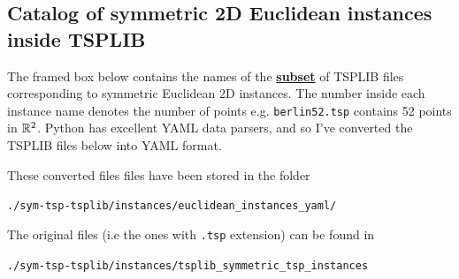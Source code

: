 \begin{appendices}
\section{Catalog of symmetric 2D Euclidean instances inside TSPLIB}
\label{sec:catalog}
The framed box below contains the names of the \textbf{\underline{subset}} of TSPLIB files corresponding to symmetric Euclidean 2D instances. 
The number inside each instance name denotes the number of points e.g. \verb|berlin52.tsp| contains 52 points in $\mathbb{R}^2$. 
Python has excellent YAML data parsers, and so I've converted the TSPLIB files below into YAML format. 

These converted files files have been stored in the folder


\begin{displayquote}
\color{blue} \Large
\begin{center}
\texttt{./sym-tsp-tsplib/instances/euclidean\_instances\_yaml/}
\end{center}
\end{displayquote}

The original files (i.e the ones with \verb|.tsp| extension) can be found in 

\begin{displayquote}
\begin{center}
\texttt{./sym-tsp-tsplib/instances/tsplib\_symmetric\_tsp\_instances}
\end{center}
\end{displayquote}


\end{appendices}

